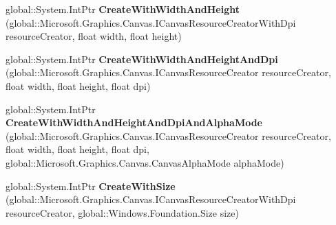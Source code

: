 \begin{DoxyCompactItemize}
\mbox{\label{interface_microsoft_1_1_graphics_1_1_canvas_1_1_u_i_1_1_xaml_1_1_i_canvas_virtual_image_source_factory_a5ce3deeb7f455cd4077cd79f1a73628d}} 
global\+::\+System.\+Int\+Ptr {\bfseries Create\+With\+Width\+And\+Height} (global\+::\+Microsoft.\+Graphics.\+Canvas.\+I\+Canvas\+Resource\+Creator\+With\+Dpi resource\+Creator, float width, float height)
\item 
\mbox{\label{interface_microsoft_1_1_graphics_1_1_canvas_1_1_u_i_1_1_xaml_1_1_i_canvas_virtual_image_source_factory_a8dec48ae093e81783bc8f960229a0cd0}} 
global\+::\+System.\+Int\+Ptr {\bfseries Create\+With\+Width\+And\+Height\+And\+Dpi} (global\+::\+Microsoft.\+Graphics.\+Canvas.\+I\+Canvas\+Resource\+Creator resource\+Creator, float width, float height, float dpi)
\item 
\mbox{\label{interface_microsoft_1_1_graphics_1_1_canvas_1_1_u_i_1_1_xaml_1_1_i_canvas_virtual_image_source_factory_ac23a6e94d90c7e30a156e1261f94f38c}} 
global\+::\+System.\+Int\+Ptr {\bfseries Create\+With\+Width\+And\+Height\+And\+Dpi\+And\+Alpha\+Mode} (global\+::\+Microsoft.\+Graphics.\+Canvas.\+I\+Canvas\+Resource\+Creator resource\+Creator, float width, float height, float dpi, global\+::\+Microsoft.\+Graphics.\+Canvas.\+Canvas\+Alpha\+Mode alpha\+Mode)
\item 
\mbox{\label{interface_microsoft_1_1_graphics_1_1_canvas_1_1_u_i_1_1_xaml_1_1_i_canvas_virtual_image_source_factory_a6ef2ceb8efc3356922c19a0c886c01a9}} 
global\+::\+System.\+Int\+Ptr {\bfseries Create\+With\+Size} (global\+::\+Microsoft.\+Graphics.\+Canvas.\+I\+Canvas\+Resource\+Creator\+With\+Dpi resource\+Creator, global\+::\+Windows.\+Foundation.\+Size size)
\item 
\mbox{\label{interface_microsoft_1_1_graphics_1_1_canvas_1_1_u_i_1_1_xaml_1_1_i_canvas_virtual_image_source_factory_a5ce3deeb7f455cd4077cd79f1a73628d}} 

\end{DoxyCompactItemize}
